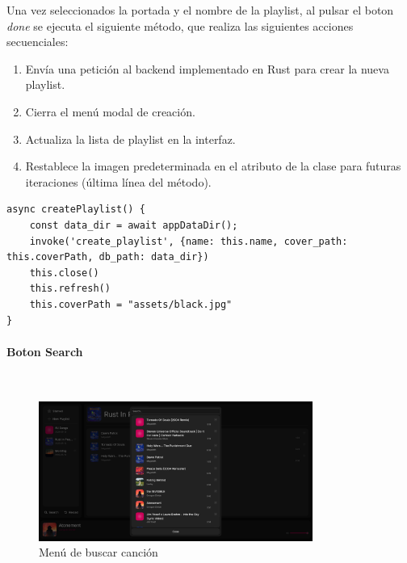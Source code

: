 \documentclass[11pt, a4paper]{article}
\begin{document}
                Una vez seleccionados la portada y el nombre de la playlist, al pulsar el boton \textit{done} se ejecuta el siguiente método, que realiza las siguientes acciones secuenciales:

                \begin{enumerate}
                    \item Envía una petición al backend implementado en Rust para crear la nueva playlist.
                    \item Cierra el menú modal de creación.
                    \item Actualiza la lista de playlist en la interfaz.
                    \item Restablece la imagen predeterminada en el atributo de la clase para futuras iteraciones (última línea del método).
                \end{enumerate}

                \begin{lstlisting}[caption={createPlaylist()}]
async createPlaylist() {
    const data_dir = await appDataDir();
    invoke('create_playlist', {name: this.name, cover_path: this.coverPath, db_path: data_dir})
    this.close()
    this.refresh()
    this.coverPath = "assets/black.jpg"
}
                \end{lstlisting}

                \paragraph{Boton Search}

                ‎ \\

                \begin{figure}[H]
                    \centering
                    \includegraphics[width=0.8\textwidth]{media/screenshots/search_song.png}
                    \caption{Menú de buscar canción}
                    \label{fig:buscar}
                \end{figure}
\end{document}
